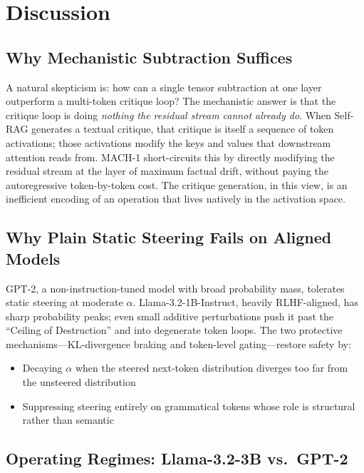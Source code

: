 \documentclass[conference]{IEEEtran}
\begin{document}
\section{Discussion}\label{sec:discussion}

\subsection{Why Mechanistic Subtraction Suffices}

A natural skepticism is: how can a single tensor subtraction at one layer outperform a multi-token critique loop? The mechanistic answer is that the critique loop is doing \emph{nothing the residual stream cannot already do}. When Self-RAG generates a textual critique, that critique is itself a sequence of token activations; those activations modify the keys and values that downstream attention reads from. MACH-1 short-circuits this by directly modifying the residual stream at the layer of maximum factual drift, without paying the autoregressive token-by-token cost. The critique generation, in this view, is an inefficient encoding of an operation that lives natively in the activation space.

\subsection{Why Plain Static Steering Fails on Aligned Models}

GPT-2, a non-instruction-tuned model with broad probability mass, tolerates static steering at moderate $\alpha$. Llama-3.2-1B-Instruct, heavily RLHF-aligned, has sharp probability peaks; even small additive perturbations push it past the ``Ceiling of Destruction'' and into degenerate token loops. The two protective mechanisms---KL-divergence braking and token-level gating---restore safety by:
\begin{itemize}
    \item Decaying $\alpha$ when the steered next-token distribution diverges too far from the unsteered distribution
    \item Suppressing steering entirely on grammatical tokens whose role is structural rather than semantic
\end{itemize}

\subsection{Operating Regimes: Llama-3.2-3B vs.\ GPT-2}
\end{document}
